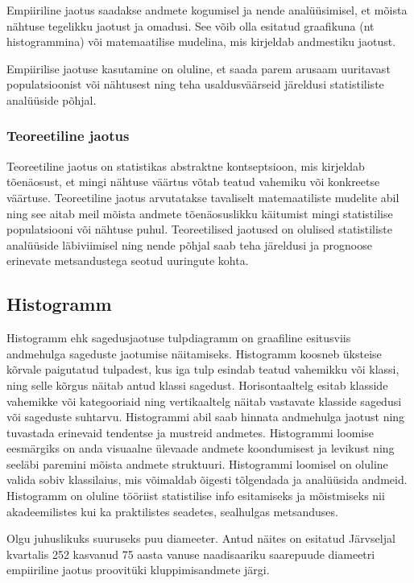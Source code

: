 \documentclass[
]{article}
\begin{document}
Empiiriline jaotus saadakse andmete kogumisel ja nende analüüsimisel, et
mõista nähtuse tegelikku jaotust ja omadusi. See võib olla esitatud
graafikuna (nt histogrammina) või matemaatilise mudelina, mis kirjeldab
andmestiku jaotust.

Empiirilise jaotuse kasutamine on oluline, et saada parem arusaam
uuritavast populatsioonist või nähtusest ning teha usaldusväärseid
järeldusi statistiliste analüüside põhjal.

\subsubsection{Teoreetiline jaotus}\label{teoreetiline-jaotus}

Teoreetiline jaotus on statistikas abstraktne kontseptsioon, mis
kirjeldab tõenäosust, et mingi nähtuse väärtus võtab teatud vahemiku või
konkreetse väärtuse. Teoreetiline jaotus arvutatakse tavaliselt
matemaatiliste mudelite abil ning see aitab meil mõista andmete
tõenäosuslikku käitumist mingi statistilise populatsiooni või nähtuse
puhul. Teoreetilised jaotused on olulised statistiliste analüüside
läbiviimisel ning nende põhjal saab teha järeldusi ja prognoose
erinevate metsandustega seotud uuringute kohta.

\subsection{Histogramm}\label{histogramm}

Histogramm ehk sagedusjaotuse tulpdiagramm on graafiline esitusviis
andmehulga sageduste jaotumise näitamiseks. Histogramm koosneb üksteise
kõrvale paigutatud tulpadest, kus iga tulp esindab teatud vahemikku või
klassi, ning selle kõrgus näitab antud klassi sagedust. Horisontaaltelg
esitab klasside vahemikke või kategooriaid ning vertikaaltelg näitab
vastavate klasside sagedusi või sageduste suhtarvu. Histogrammi abil
saab hinnata andmehulga jaotust ning tuvastada erinevaid tendentse ja
mustreid andmetes. Histogrammi loomise eesmärgiks on anda visuaalne
ülevaade andmete koondumisest ja levikust ning seeläbi paremini mõista
andmete struktuuri. Histogrammi loomisel on oluline valida sobiv
klassilaius, mis võimaldab õigesti tõlgendada ja analüüsida andmeid.
Histogramm on oluline tööriist statistilise info esitamiseks ja
mõistmiseks nii akadeemilistes kui ka praktilistes seadetes, sealhulgas
metsanduses.

\begin{example}
Olgu juhuslikuks suuruseks puu diameeter. Antud näites on esitatud
Järvseljal kvartalis 252 kasvanud 75 aasta vanuse naadisaariku
saarepuude diameetri empiiriline jaotus proovitüki kluppimisandmete
järgi.
\end{example}
\end{document}
